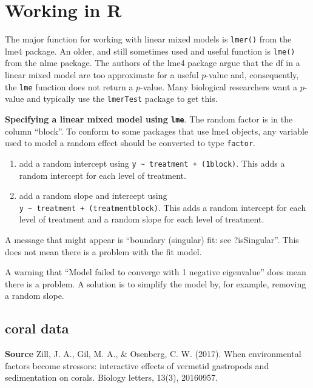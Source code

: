 \documentclass[]{book}
\providecommand{\tightlist}{%
  \setlength{\itemsep}{0pt}\setlength{\parskip}{0pt}}
\begin{document}
\hypertarget{working-in-r-5}{%
\section{Working in R}\label{working-in-r-5}}

The major function for working with linear mixed models is \texttt{lmer()} from the lme4 package. An older, and still sometimes used and useful function is \texttt{lme()} from the nlme package. The authors of the lme4 package argue that the df in a linear mixed model are too approximate for a useful \(p\)-value and, consequently, the \texttt{lme} function does not return a \(p\)-value. Many biological researchers want a \(p\)-value and typically use the \texttt{lmerTest} package to get this.

\textbf{Specifying a linear mixed model using \texttt{lme}}. The random factor is in the column ``block''. To conform to some packages that use lme4 objects, any variable used to model a random effect should be converted to type \texttt{factor}.

\begin{enumerate}
\def\labelenumi{\arabic{enumi}.}
\tightlist
\item
  add a random intercept using \texttt{y\ \textasciitilde{}\ treatment\ +\ (1\textbar{}block)}. This adds a random intercept for each level of treatment.
\item
  add a random slope and intercept using \texttt{y\ \textasciitilde{}\ treatment\ +\ (treatment\textbar{}block)}. This adds a random intercept for each level of treatment and a random slope for each level of treatment.
\end{enumerate}

A message that might appear is ``boundary (singular) fit: see ?isSingular''. This does not mean there is a problem with the fit model.

A warning that ``Model failed to converge with 1 negative eigenvalue'' does mean there is a problem. A solution is to simplify the model by, for example, removing a random slope.

\hypertarget{coral-data}{%
\subsection{coral data}\label{coral-data}}

\textbf{Source} Zill, J. A., Gil, M. A., \& Osenberg, C. W. (2017). When environmental factors become stressors: interactive effects of vermetid gastropods and sedimentation on corals. Biology letters, 13(3), 20160957.
\end{document}
